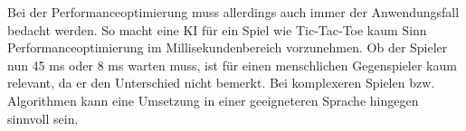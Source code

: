 Bei der Performanceoptimierung muss allerdings auch immer der Anwendungsfall bedacht werden. So macht eine KI für ein Spiel wie Tic-Tac-Toe 
kaum Sinn Performanceoptimierung im Millisekundenbereich vorzunehmen. Ob der Spieler nun 45 ms oder 8 ms warten muss, ist für einen menschlichen 
Gegenspieler kaum relevant, da er den Unterschied nicht bemerkt. Bei komplexeren Spielen bzw. Algorithmen kann eine Umsetzung in einer 
geeigneteren Sprache hingegen sinnvoll sein.



